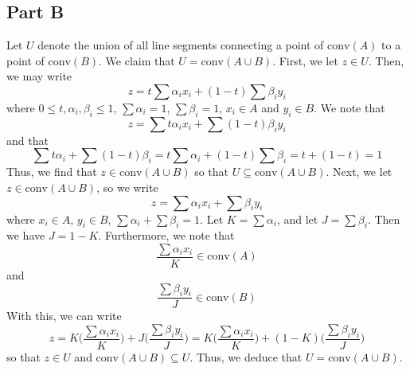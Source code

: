 \documentclass[12pt]{article}
\begin{document}
\subsection*{Part B}
Let $U$ denote the union of all line segments connecting a point of $\text{conv}(A)$ to a point of $\text{conv}(B)$. We claim that $U = \text{conv}(A \cup B)$. First, we let $z \in U$. Then, we may write
\[
z =  t\sum \alpha_i x_i + (1-t)\sum \beta_i y_i
\] where $0 \leq t,\alpha_i,\beta_i \leq 1$, $\sum \alpha_i  = 1$, $\sum \beta_i = 1$, $x_i \in A$ and $y_i \in B$. We note that
\[
z = \sum t \alpha_i x_i + \sum (1-t)\beta_i y_i
\]
and that
\[
\sum t \alpha_i + \sum (1-t) \beta_i = t \sum \alpha_i + (1-t) \sum \beta_i = t + (1-t) = 1
\] Thus, we find that $z \in \text{conv}(A \cup B)$ so that $U \subseteq \text{conv}(A \cup B)$. Next, we let $z \in \text{conv}(A \cup B)$, so we write
\[
z = \sum \alpha_i x_i + \sum \beta_i y_i
\] where $x_i \in A$, $y_i \in B$, $\sum \alpha_i + \sum \beta_i = 1$. Let $K = \sum \alpha_i$, and let $J = \sum \beta_i$. Then we have $J = 1-K$. Furthermore, we note that
\[
 \frac{\sum \alpha_i x_i}{K} \in \text{conv}(A)
\] and
\[
\frac{\sum \beta_i y_i}{J} \in \text{conv}(B)
\] With this, we can write
\[
z = K\bigg(\frac{\sum \alpha_i x_i}{K}\bigg) + J\bigg(\frac{\sum \beta_i y_i}{J} \bigg) = K\bigg(\frac{\sum \alpha_i x_i}{K}\bigg) + (1-K)\bigg(\frac{\sum \beta_i y_i}{J} \bigg)
\] so that $z \in U$ and $\text{conv}(A \cup B) \subseteq U$. Thus, we deduce that $U = \text{conv}(A \cup B)$.
\newpage
\end{document}
